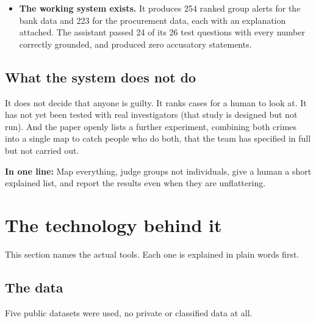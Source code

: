 \documentclass[11pt,a4paper]{article}
\newcommand{\inoneline}[1]{%
  \medskip\noindent\colorbox{gray!10}{\parbox{\dimexpr\linewidth-2\fboxsep}{%
  \textbf{In one line:} #1}}\medskip}
\begin{document}
\begin{itemize}
\item \textbf{The working system exists.} It produces 254 ranked group alerts
      for the bank data and 223 for the procurement data, each with an
      explanation attached. The assistant passed 24 of its 26 test questions
      with every number correctly grounded, and produced zero accusatory
      statements.
\end{itemize}

\subsection{What the system does not do}

It does not decide that anyone is guilty. It ranks cases for a human to look
at. It has not yet been tested with real investigators (that study is designed
but not run). And the paper openly lists a further experiment, combining both
crimes into a single map to catch people who do both, that the team has
specified in full but not carried out.

\inoneline{Map everything, judge groups not individuals, give a human a short
explained list, and report the results even when they are unflattering.}

\section{The technology behind it}

This section names the actual tools. Each one is explained in plain words
first.

\subsection{The data}

Five public datasets were used, no private or classified data at all.
\end{document}
